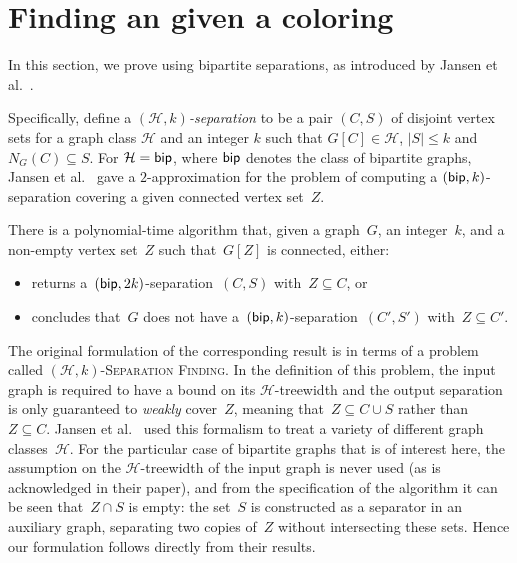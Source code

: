 \section{Finding an \occ given a coloring}
\label{sec:proofs:oct:finding}

In this section, we prove  using 
bipartite separations, as introduced by Jansen et al.~\cite{JansenKW22}. 

Specifically, define a \emph{$(\mathcal{H},k)$-separation} to be 
a pair $(C,S)$ of disjoint vertex sets for a graph class $\mathcal{H}$ and
an integer $k$ such that $G[C] \in \mathcal{H}$, $|S| \leq k$ and $N_G(C) \subseteq S$.
%
For $\mathcal{H}=\textnormal{\textsf{bip}}$, where $\textnormal{\textsf{bip}}$ denotes the class of bipartite graphs,
Jansen et al.~\cite{JansenKW22} gave a $2$-approximation for the problem of computing a $(\textnormal{\textsf{bip}}, k)$-separation covering a given connected vertex set~$Z$.

\begin{corollary} \label{cor:bipartite-separation}
  There is a polynomial-time algorithm that, given a graph~$G$, an integer~$k$, and a non-empty vertex set~$Z$ such that~$G[Z]$ is connected, either:
	\begin{itemize}
		\item returns a~$(\textnormal{\textsf{bip}}, 2k)$-separation~$(C,S)$ with~$Z \subseteq C$, or
		\item concludes that~$G$ does not have a~$(\textnormal{\textsf{bip}}, k)$-separation~$(C',S')$ with~$Z \subseteq C'$.
	\end{itemize}
\end{corollary}

The original formulation of the corresponding result is in terms of a problem called \textsc{$(\mathcal{H}, k)$-Separation Finding}. In the definition of this problem, the input graph is required to have a bound on its $\mathcal{H}$-treewidth and the output separation is only guaranteed to \emph{weakly} cover~$Z$, meaning that~$Z \subseteq C \cup S$ rather than~$Z \subseteq C$. Jansen et al.~\cite{JansenKW22} used this formalism to treat a variety of different graph classes~$\mathcal{H}$. For the particular case of bipartite graphs that is of interest here, the assumption on the $\mathcal{H}$-treewidth of the input graph is never used (as is acknowledged in their paper), and from the specification of the algorithm it can be seen that~$Z \cap S$ is empty: the set~$S$ is constructed as a separator in an auxiliary graph, separating two copies of~$Z$ without intersecting these sets. Hence our formulation follows directly from their results.

